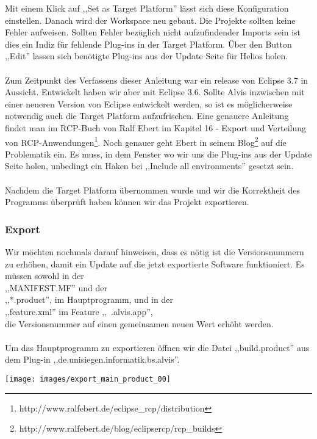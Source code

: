 \documentclass[10pt,a4paper]{article}
\begin{document}
Mit einem Klick auf ,,Set as Target Platform'' lässt sich diese Konfiguration einstellen. 
Danach wird der Workspace neu gebaut. Die Projekte sollten keine Fehler aufweisen. Sollten Fehler bezüglich nicht aufzufindender Imports sein ist dies ein Indiz für fehlende Plug-ins in der Target Platform. Über den Button ,,Edit'' lassen sich benötigte Plug-ins aus der Update Seite für Helios holen.
\\ \\
Zum Zeitpunkt des Verfassens dieser Anleitung war ein release von Eclipse 3.7 in Aussicht. Entwickelt haben wir aber  mit Eclipse 3.6. Sollte Alvis inzwischen mit einer neueren Version von Eclipse entwickelt werden, so ist es möglicherweise notwendig auch die Target Platform aufzufrischen. Eine genauere Anleitung findet man im RCP-Buch von Ralf Ebert im Kapitel 16 - Export und Verteilung von RCP-Anwendungen\footnote{http://www.ralfebert.de/eclipse\_rcp/distribution\/}. Noch genauer geht Ebert in seinem Blog\footnote{http://www.ralfebert.de/blog/eclipsercp/rcp\_builds\/} auf die Problematik ein. Es muss, in dem Fenster wo wir uns die Plug-ins aus der Update Seite holen, unbedingt ein Haken bei ,,Include all environments'' gesetzt sein.
\\ \\

Nachdem die Target Platform übernommen wurde und wir die Korrektheit des Programms überprüft haben können wir das Projekt exportieren. 
\subsubsection{Export}
Wir möchten nochmals darauf hinweisen, dass es nötig ist die Versionsnummern zu erhöhen, damit ein Update auf die jetzt exportierte Software funktioniert. Es müssen sowohl in der \\
,,MANIFEST.MF'' und der \\
,,*.product'', im Hauptprogramm, und in der \\
,,feature.xml'' im Feature ,,~.alvis.app'', \\
die Versionsnummer auf einen gemeinsamen neuen Wert erhöht werden.
\\ \\
Um das Hauptprogramm zu exportieren öffnen wir die Datei ,,build.product'' aus dem Plug-in ,,de.unisiegen.informatik.bs.alvis''.

\begin{center}
\texttt{[image: images/export\_main\_product\_00]}
\end{center}
\end{document}
